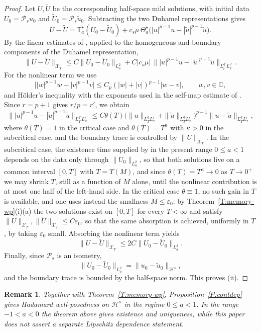 \documentclass[11pt,letter]{amsart}
\numberwithin{equation}{section}
\newcommand{\C}{\mathbb{C}}
\newtheorem{remark}[theorem]{Remark}
\numberwithin{equation}{section}
\begin{document}
\begin{proof}
Let $U,\widetilde U$ be the corresponding half-space mild solutions, with
initial data $U_0=\mathcal P_su_0$ and
$\widetilde U_0=\mathcal P_s\widetilde u_0$. Subtracting the two Duhamel
representations gives
\[
U-\widetilde U
=\mathbb T_a^\star(U_0-\widetilde U_0)
+c_s\mu\,\Theta_a^\star\bigl(|u|^{p-1}u-|
\widetilde u|^{p-1}\widetilde u\bigr).
\]
By the linear estimates of \cite[Theorem~2.4]{GS2}, applied to the
homogeneous and boundary components of the Duhamel representation,
\[
\|U-\widetilde U\|_{\mathcal X_T}
\leq C\|U_0-\widetilde U_0\|_{L^2_a}
+C|c_s\mu|\,
\bigl\||u|^{p-1}u-|\widetilde u|^{p-1}\widetilde u\bigr\|_{L^{q'}_tL^{r'}_x}.
\]
For the nonlinear term we use
\[
\bigl||w|^{p-1}w-|v|^{p-1}v\bigr|
\leq C_p(|w|+|v|)^{p-1}|w-v|,
\qquad w,v\in\C,
\]
and H\"older's inequality with the exponents used in the self-map estimate
of \cite{GS2}. Since $r=p+1$ gives $r/p=r'$, we obtain
\[
\bigl\||u|^{p-1}u-|\widetilde u|^{p-1}\widetilde u\bigr\|_{L^{q'}_TL^{r'}_x}
\leq C\theta(T)
\bigl(\|u\|_{L^q_TL^r_x}+\|\widetilde u\|_{L^q_TL^r_x}\bigr)^{p-1}
\|u-\widetilde u\|_{L^q_TL^r_x},
\]
where $\theta(T)=1$ in the critical case and $\theta(T)=T^\kappa$ with
$\kappa>0$ in the subcritical case, and the boundary trace is controlled by
$\|U\|_{\mathcal X_T}$. In the subcritical case, the existence time supplied by
\cite[Theorem~2.9(2)]{GS2} in the present range $0\le a<1$ depends on the data
only through $\|U_0\|_{L^2_a}$, so that both solutions live on a common
interval $[0,T]$ with $T=T(M)$, and since $\theta(T)=T^\kappa\to0$ as
$T\to0^+$ we may shrink $T$, still as a function of $M$ alone, until the
nonlinear contribution is at most one half of the left-hand side. In the
critical case $\theta\equiv1$, no such gain in $T$ is available, and one uses
instead the smallness $M\le\varepsilon_0$: by
Theorem~\ref{T:memory-wp}(i)(a) the two solutions exist on $[0,T]$ for every
$T<\infty$ and satisfy $\|U\|_{\mathcal X_T},\|\widetilde U\|_{\mathcal X_T}\le
C\varepsilon_0$, so that the same absorption is achieved, uniformly in $T$, by
taking $\varepsilon_0$ small. Absorbing the nonlinear term yields
\[
\|U-\widetilde U\|_{\mathcal X_T}
\leq 2C\|U_0-\widetilde U_0\|_{L^2_a}.
\]
Finally, since $\mathcal P_s$ is an isometry,
\[
\|U_0-\widetilde U_0\|_{L^2_a}
=\|u_0-\widetilde u_0\|_{\mathcal H^s},
\]
and the boundary trace is bounded by the half-space norm. This proves (ii).

\end{proof}

\begin{remark}
Together with Theorem~\ref{T:memory-wp}, Proposition~\ref{P:contdep} gives
Hadamard well-posedness on $\mathcal H^s$ in the regime $0\le a<1$. In the
range $-1<a<0$ the theorem above gives existence and uniqueness, while this
paper does not assert a separate Lipschitz dependence statement.
\end{remark}
\end{document}
